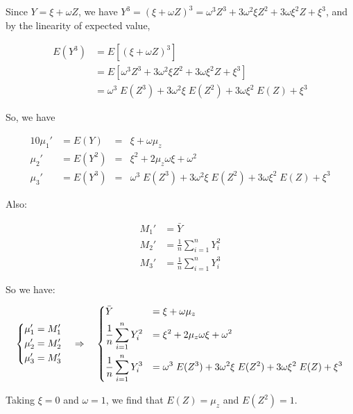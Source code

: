 \documentclass{article}
\begin{document}
Since $Y = \xi + \omega Z$, we have $Y^3 = (\xi + \omega Z)^3 = \omega^3 Z^3 + 3 \omega^2 \xi Z^2 +
3 \omega \xi^2 Z + \xi^3$, and by the linearity of expected value,

\begin{align}
  E(Y^3) &= E [(\xi + \omega Z)^3] \nonumber \\
  &= E[\omega^3 Z^3 + 3 \omega^2 \xi Z^2 + 3 \omega \xi^2 Z + \xi^3] \nonumber \\
  &= \omega^3\;E(Z^3) + 3 \omega^2 \xi\;E(Z^2) + 3 \omega \xi^2\;E(Z) + \xi^3
\end{align}

So, we have

\begin{alignat*}{10}
  \mu_1' &= E(Y) &=& \xi + \omega \mu_z \\
  \mu_2' &= E(Y^2) &=& \xi^2 + 2 \mu_z \omega \xi + \omega^2 \\
  \mu_3' &= E(Y^3) &=& \omega^3\;E(Z^3) + 3 \omega^2 \xi\;E(Z^2) + 3 \omega \xi^2\;E(Z) + \xi^3
\end{alignat*}

Also:

\begin{align*}
  M_1' &= \bar Y \\
  M_2' &= \frac{1}{n} \sum_{i=1}^n Y_i^2 \\
  M_3' &= \frac{1}{n} \sum_{i=1}^n Y_i^3
\end{align*}

So we have:

\begin{equation*}
  \begin{dcases}
    \mu_1' = M_1' \\
    \mu_2' = M_2' \\
    \mu_3' = M_3' \\
  \end{dcases}
  \quad \Rightarrow \quad
  \begin{dcases}
    \bar Y &= \xi + \omega \mu_z \\
    \frac{1}{n} \sum_{i=1}^n Y_i^2 &= \xi^2 + 2 \mu_z \omega \xi + \omega^2 \\
    \frac{1}{n} \sum_{i=1}^n Y_i^3 &= \omega^3\;E(Z^3) + 3 \omega^2 \xi\;E(Z^2) + 3 \omega \xi^2\;E(Z) + \xi^3
  \end{dcases}
\end{equation*}

Taking $\xi = 0$ and $\omega = 1$, we find that $E(Z) = \mu_z$ and $E(Z^2) = 1$.
\end{document}
